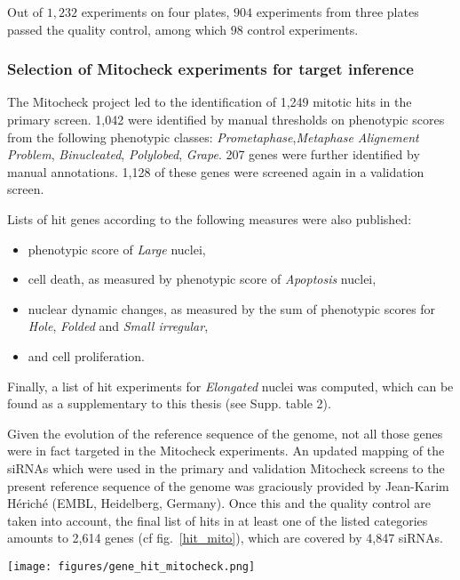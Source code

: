 Out of $1,232$ experiments on four plates, $904$ experiments from three plates passed the quality control, among which $98$ control experiments.

\subsubsection{Selection of Mitocheck experiments for target inference}
\label{sec:selection_mitocheck}
The Mitocheck project led to the identification of 1,249 mitotic hits in the primary screen. 1,042 were identified by manual thresholds on phenotypic scores from the following phenotypic classes: \textit{Prometaphase},\textit{Metaphase Alignement Problem}, \textit{Binucleated}, \textit{Polylobed}, \textit{Grape}. 207 genes were further identified by manual annotations. 1,128 of these genes were screened again in a validation screen.

Lists of hit genes according to the following measures were also published:
\begin{itemize}
\item phenotypic score of \textit{Large} nuclei,
\item cell death, as measured by phenotypic score of \textit{Apoptosis} nuclei,
\item nuclear dynamic changes, as measured by the sum of phenotypic scores for \textit{Hole}, \textit{Folded} and \textit{Small irregular},
\item and cell proliferation.
\end{itemize}

Finally, a list of hit experiments for \textit{Elongated} nuclei was computed, which can be found as a supplementary to this thesis (see Supp. table 2).

Given the evolution of the reference sequence of the genome, not all those genes were in fact targeted in the Mitocheck experiments. An updated mapping of the siRNAs which were used in the primary and validation Mitocheck screens to the present reference sequence of the genome was graciously provided by Jean-Karim Hériché (EMBL, Heidelberg, Germany). Once this and the quality control are taken into account, the final list of hits in at least one of the listed categories amounts to 2,614 genes (cf fig.~\ref{hit_mito}), which are covered by 4,847 siRNAs.

\begin{figure*}[ht!]
\centerline{\texttt{[image: figures/gene\_hit\_mitocheck.png]}
}
\caption{Number of hit genes per category. As hit detection is univariate, a gene can be in more than one category.}
\label{hit_mito}
\end{figure*}

